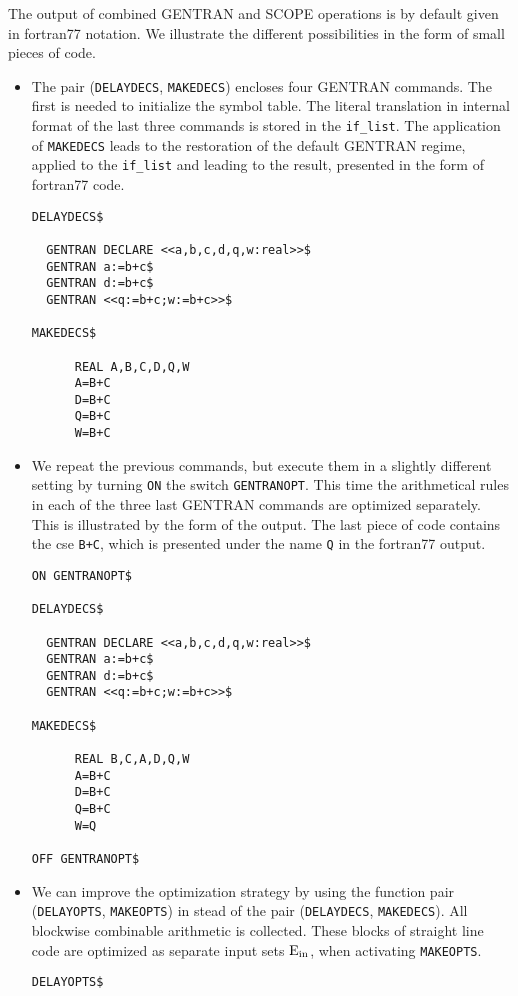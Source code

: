 \example\label{ex:8.1}

The output of combined GENTRAN and SCOPE operations is by default given 
in fortran77 notation. We illustrate the different possibilities in the
form of small pieces of code.
\begin{itemize}
\item The pair ({\tt DELAYDECS}, {\tt MAKEDECS}) encloses four GENTRAN commands.
The first is needed to initialize the symbol table. The literal translation in
internal format of the last three commands is stored in the {\tt if\_list}.
The application of {\tt MAKEDECS} leads to the restoration of the default
GENTRAN regime, applied to the {\tt if\_list} and leading to the result,
presented in the form of fortran77 code.
{\small
\begin{verbatim}
DELAYDECS$

  GENTRAN DECLARE <<a,b,c,d,q,w:real>>$
  GENTRAN a:=b+c$
  GENTRAN d:=b+c$
  GENTRAN <<q:=b+c;w:=b+c>>$

MAKEDECS$

      REAL A,B,C,D,Q,W
      A=B+C
      D=B+C
      Q=B+C
      W=B+C
\end{verbatim}}
\item We repeat the previous commands, but execute them in a slightly different
setting by turning {\tt ON} the switch {\tt GENTRANOPT}. This time the
arithmetical rules in each of the three last GENTRAN commands are optimized 
separately.  This is illustrated by the form of the output. The last piece of 
code contains the cse {\tt B+C}, which is presented under the name {\tt Q} 
in the fortran77 output.
{\small
\begin{verbatim}
ON GENTRANOPT$

DELAYDECS$

  GENTRAN DECLARE <<a,b,c,d,q,w:real>>$
  GENTRAN a:=b+c$
  GENTRAN d:=b+c$
  GENTRAN <<q:=b+c;w:=b+c>>$

MAKEDECS$

      REAL B,C,A,D,Q,W
      A=B+C
      D=B+C
      Q=B+C
      W=Q

OFF GENTRANOPT$
\end{verbatim}}
\item We can improve the optimization strategy by using the function pair
({\tt DELAYOPTS}, {\tt MAKEOPTS}) in stead of the
pair ({\tt DELAYDECS}, {\tt MAKEDECS}). All blockwise combinable arithmetic
is collected. These blocks of straight line code are optimized as separate
input sets ${\rm E_{in}}$, when activating {\tt MAKEOPTS}.
{\small
\begin{verbatim}
DELAYOPTS$


\end{verbatim}}
\end{itemize}
